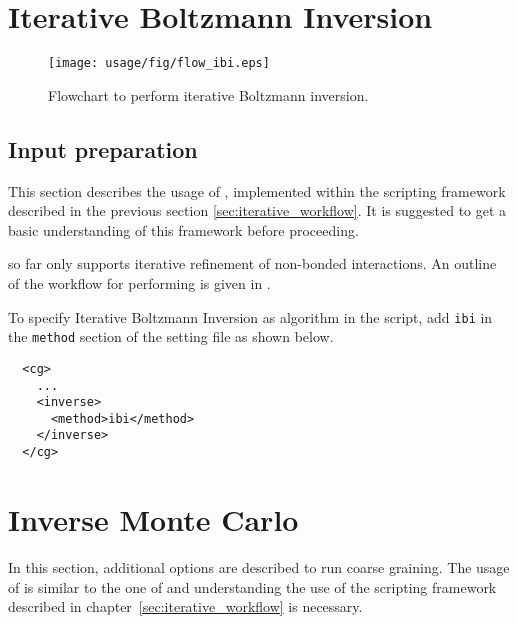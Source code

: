 
\section{Iterative Boltzmann Inversion}
\begin{figure}
   \centering
   \texttt{[image: usage/fig/flow\_ibi.eps]}
   \caption{\label{fig:flow_ibi}Flowchart to perform iterative Boltzmann inversion.}
\end{figure}

\subsection{Input preparation}
This section describes the usage of \ibi, implemented within the scripting framework described in the previous section \ref{sec:iterative_workflow}. It is suggested to get a basic understanding of this framework before proceeding.

\ibi so far only supports iterative refinement of non-bonded interactions. An outline of the workflow for performing \ibi is given in .

To specify Iterative Boltzmann Inversion as algorithm in the script, add \texttt{ibi} in the \texttt{method} section of the \xml setting file as shown below.

\begin{lstlisting}
  <cg>
    ...
    <inverse>
      <method>ibi</method>
    </inverse>
  </cg>
\end{lstlisting}



\section{Inverse Monte Carlo}
In this section, additional options are described to run \imc coarse graining. The usage of \imc is similar to the one of \ibi and understanding the use of the scripting framework described in chapter~\ref{sec:iterative_workflow} is necessary.

